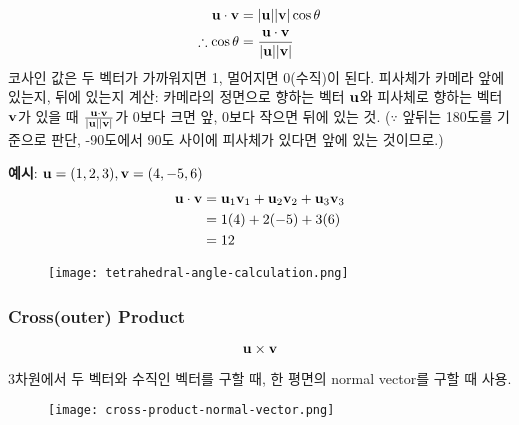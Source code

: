 $$
\begin{aligned}
  \bold{u} \cdot \bold{v} &= |\bold{u}| |\bold{v}| \cos{\theta} \\
  \therefore \cos{\theta} &= {{\bold{u} \cdot \bold{v}} \over |\bold{u}| |\bold{v}|}
\end{aligned}
$$
코사인 값은 두 벡터가 가까워지면 1, 멀어지면 0(수직)이 된다. 피사체가 카메라 앞에 있는지, 뒤에 있는지 계산: 카메라의 정면으로 향하는 벡터 $\bold{u}$와 피사체로 향하는 벡터 $\bold{v}$가 있을 때 $\bold{u} \cdot \bold{v} \over |\bold{u}| |\bold{v}|$가 0보다 크면 앞, 0보다 작으면 뒤에 있는 것. ($\because$ 앞뒤는 180도를 기준으로 판단, -90도에서 90도 사이에 피사체가 있다면 앞에 있는 것이므로.)

\begin{framed}
  \noindent \textbf{예시}: $\bold{u} = (1, 2, 3), \bold{v} = (4, -5, 6)$
  $$
  \begin{aligned}
    \bold{u} \cdot \bold{v} &= \bold{u}_1 \bold{v}_1 + \bold{u}_2 \bold{v}_2 + \bold{u}_3 \bold{v}_3 \\
    &= 1(4) + 2(-5) + 3(6) \\
    &= 12
  \end{aligned}
  $$
\end{framed}

\begin{figure}[h]
  \centering
  \texttt{[image: tetrahedral-angle-calculation.png]}
\end{figure}

\subsubsection{Cross(outer) Product}

$$\bold{u} \times \bold{v}$$

3차원에서 두 벡터와 수직인 벡터를 구할 때, 한 평면의 normal vector를 구할 때 사용.

\begin{figure}[h]
  \centering
  \texttt{[image: cross-product-normal-vector.png]}
\end{figure}

